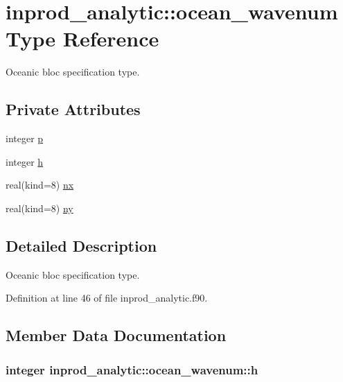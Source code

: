 \hypertarget{structinprod__analytic_1_1ocean__wavenum}{\section{inprod\-\_\-analytic\-:\-:ocean\-\_\-wavenum Type Reference}
\label{structinprod__analytic_1_1ocean__wavenum}
}


Oceanic bloc specification type.  


\subsection*{Private Attributes}
\begin{DoxyCompactItemize}
\item 
integer \hyperlink{structinprod__analytic_1_1ocean__wavenum_a3170ff1b2a81b58ae81527a964682c06}{p}
\item 
integer \hyperlink{structinprod__analytic_1_1ocean__wavenum_a0669827dd9b250ef505da012599c40ff}{h}
\item 
real(kind=8) \hyperlink{structinprod__analytic_1_1ocean__wavenum_a6084ea7c554f942e74779a2be38b7d3d}{nx}
\item 
real(kind=8) \hyperlink{structinprod__analytic_1_1ocean__wavenum_a0738c305f503d7864a9073c5cea352ab}{ny}
\end{DoxyCompactItemize}


\subsection{Detailed Description}
Oceanic bloc specification type. 

Definition at line 46 of file inprod\-\_\-analytic.\-f90.



\subsection{Member Data Documentation}
\hypertarget{structinprod__analytic_1_1ocean__wavenum_a0669827dd9b250ef505da012599c40ff}{
\subsubsection[{h}]{\setlength{\rightskip}{0pt plus 5cm}integer inprod\-\_\-analytic\-::ocean\-\_\-wavenum\-::h\hspace{0.3cm}{\ttfamily [private]}}}\label{structinprod__analytic_1_1ocean__wavenum_a0669827dd9b250ef505da012599c40ff}


